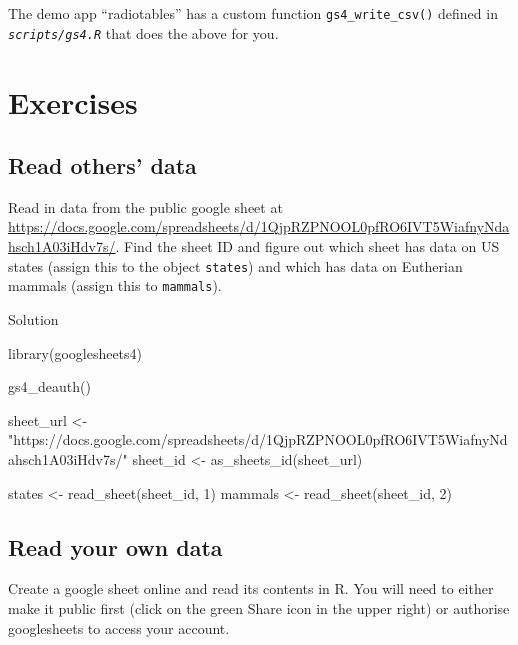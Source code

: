 \documentclass[
  oneside]{book}
\newenvironment{Shaded}{\begin{snugshade}}{\end{snugshade}}
\newcommand{\DecValTok}[1]{\textcolor[rgb]{0.00,0.00,0.81}{#1}}
\newcommand{\FunctionTok}[1]{\textcolor[rgb]{0.00,0.00,0.00}{#1}}
\newcommand{\NormalTok}[1]{#1}
\newcommand{\OtherTok}[1]{\textcolor[rgb]{0.56,0.35,0.01}{#1}}
\newcommand{\StringTok}[1]{\textcolor[rgb]{0.31,0.60,0.02}{#1}}
\begin{document}
The demo app ``radiotables'' has a custom function \texttt{gs4\_write\_csv}\texttt{()} defined in \textit{\texttt{scripts/gs4.R}} that does the above for you.

\hypertarget{exercises-data}{%
\section{Exercises}\label{exercises-data}}

\hypertarget{read-others-data}{%
\subsection{Read others' data}\label{read-others-data}}

Read in data from the public google sheet at \url{https://docs.google.com/spreadsheets/d/1QjpRZPNOOL0pfRO6IVT5WiafnyNdahsch1A03iHdv7s/}. Find the sheet ID and figure out which sheet has data on US states (assign this to the object \texttt{states}) and which has data on Eutherian mammals (assign this to \texttt{mammals}).

Solution

\begin{Shaded}
\begin{Highlighting}[]
\FunctionTok{library}\NormalTok{(googlesheets4)}

\FunctionTok{gs4\_deauth}\NormalTok{()}

\NormalTok{sheet\_url }\OtherTok{\textless{}{-}} \StringTok{"https://docs.google.com/spreadsheets/d/1QjpRZPNOOL0pfRO6IVT5WiafnyNdahsch1A03iHdv7s/"}
\NormalTok{sheet\_id }\OtherTok{\textless{}{-}} \FunctionTok{as\_sheets\_id}\NormalTok{(sheet\_url)}

\NormalTok{states }\OtherTok{\textless{}{-}} \FunctionTok{read\_sheet}\NormalTok{(sheet\_id, }\DecValTok{1}\NormalTok{)}
\NormalTok{mammals }\OtherTok{\textless{}{-}} \FunctionTok{read\_sheet}\NormalTok{(sheet\_id, }\DecValTok{2}\NormalTok{)}
\end{Highlighting}
\end{Shaded}

\hypertarget{read-your-own-data}{%
\subsection{Read your own data}\label{read-your-own-data}}

Create a google sheet online and read its contents in R. You will need to either make it public first (click on the green Share icon in the upper right) or authorise googlesheets to access your account.
\end{document}

